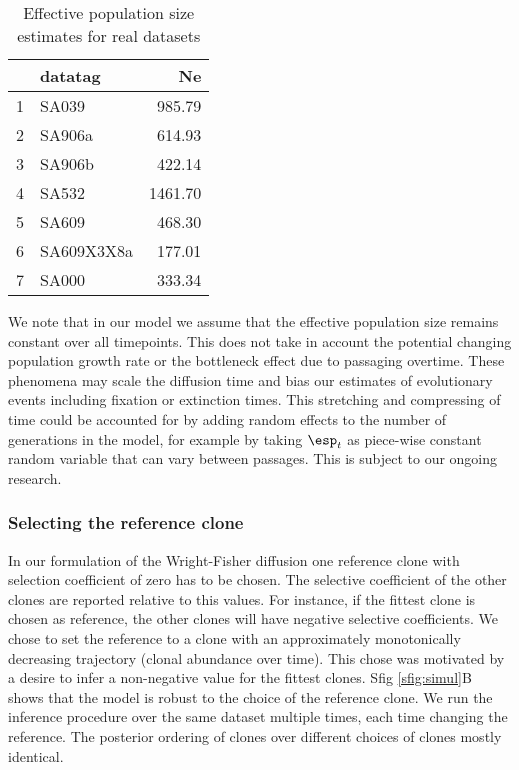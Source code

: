 \documentclass{article}
\begin{document}
\begin{table}[ht]
\centering
\caption{Effective population size estimates for real datasets}
\label{stab:ne_estimate}
\begin{tabular}{rlr}
  \hline
 & datatag & Ne \\ 
  \hline
1 & SA039 & 985.79 \\ 
  2 & SA906a & 614.93 \\ 
  3 & SA906b & 422.14 \\ 
  4 & SA532 & 1461.70 \\ 
  5 & SA609 & 468.30 \\ 
  6 & SA609X3X8a & 177.01 \\ 
  7 & SA000 & 333.34 \\ 
   \hline
\end{tabular}
\end{table}


We note that in our model we assume that the effective population size remains constant over all timepoints. 
This does not take in account the potential changing population growth rate or the bottleneck effect due to passaging overtime. 
These phenomena may scale the diffusion time and bias our estimates of evolutionary events including fixation or extinction times. 
This stretching and compressing of time could be accounted for by adding random effects to the number of generations in the model, for example by taking $\esp_t$ as piece-wise constant random variable that can vary between passages.
This is subject to our ongoing research.



\subsubsection{Selecting the reference clone}
\label{ssec:select_ref}
In our formulation of the Wright-Fisher diffusion one reference clone with selection coefficient of zero has to be chosen. 
The selective coefficient of the other clones are reported relative to this values. 
For instance, if the fittest clone is chosen as reference, the other clones will have negative selective coefficients. 
We chose to set the reference to a clone with an approximately monotonically decreasing trajectory (clonal abundance over time). 
This chose was motivated by a desire to infer a non-negative value for the fittest clones.
Sfig \ref{sfig:simul}B shows that the model is robust to the choice of the reference clone.
We run the inference procedure over the same dataset multiple times, each time changing the reference.
The posterior ordering of clones over different choices of clones mostly identical.
\end{document}
